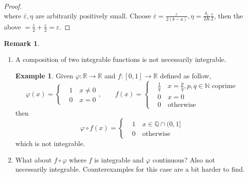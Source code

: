 \documentclass[a4paper]{article}
\theoremstyle{definition}
\newtheorem{example}[defn]{Example}
\newtheorem*{remark}{Remark}
\begin{document}
\begin{proof}
\[\]
where $\overline{\varepsilon},\eta$ are arbitrarily positively small. Choose $\overline{\varepsilon}=\frac{\varepsilon}{2(b-a)},\eta=\frac{\delta_{\overline{\varepsilon}}}{2K} \frac{\varepsilon}{2}$, then the above $=\frac{\varepsilon}{2}+\frac{\varepsilon}{2}=\varepsilon$.
\end{proof}

\begin{remark}
\begin{enumerate}
    \item A composition of two integrable functions is not necessarily integrable.
    \begin{example}
        Given $\varphi:\mathbb R \rightarrow \mathbb R$ and $f:[0,1]\rightarrow \mathbb R$ defined as follow,
\[
\varphi(x)=\left\{ \begin{aligned}
        &1 \quad x\neq 0 \\ &0\quad x=0
        \end{aligned} \right. , \qquad f(x)=\left\{ \begin{aligned}
        &\frac{1}{q} \quad x=\frac{p}{q}, p,q\in \mathbb N\text{ coprime} \\ &0\quad x=0\\&0\quad \text{otherwise}
        \end{aligned} \right.
\]
then
\[
\varphi \circ f (x)=\left\{ \begin{aligned}
            &1 \quad x\in \mathbb Q \cap (0,1] \\ &0 \quad \text{otherwise}
        \end{aligned} \right.
\]
which is not integrable.
    \end{example}
    \item What about $f\circ \varphi$ where $f$ is integrable and $\varphi$ continuous? Also not necessarily integrable. Counterexamples for this case are a bit harder to find.
\end{enumerate}
\end{remark}
\end{document}
